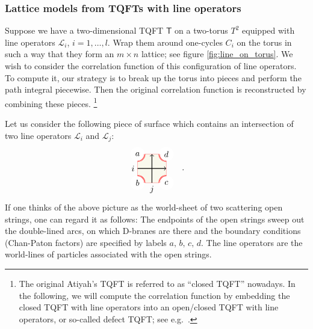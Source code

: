 \subsubsection{Lattice models from TQFTs with line operators}

Suppose we have a two-dimensional TQFT $\mathsf{T}$ on a two-torus
$T^{2}$ equipped with line operators $\mathcal{L}_{i}$, $i=1,\ldots,l$.
Wrap them around one-cycles $C_{i}$ on the torus in such a way that
they form an $m\times n$ lattice; see figure \ref{fig:line_on_torus}. We wish to consider the correlation
function of this configuration of line operators. To compute it, our
strategy is to break up the torus into pieces and perform
the path integral piecewise. Then the original correlation function
is reconstructed by combining these pieces.%
%
\footnote{The original Atiyah's TQFT is referred to as ``closed TQFT'' nowadays.
In the following, we will compute the correlation function by embedding
the closed TQFT with line operators into an open/closed TQFT with
line operators, or so-called defect TQFT; see e.g.~\cite{Lazaroiu:2000rk,Moore:2006dw,Carqueville:2016nqk}.}
%


Let us consider the following piece of surface which contains an intersection
of two line operators $\mathcal{L}_{i}$ and $\mathcal{L}_{j}$:
\begin{equation}
  \label{eq:piece_of_lines}
    \begin{tikzpicture}[scale=0.6, baseline=(x.base)]
        \node (x) at (0,0) {\vphantom{x}};

        \draw[color=red!50, fill=olive!5] (-1,-1) rectangle (1,1);

        \fill[color=white] (-1,1) circle (0.5);  \node (a) at (-1,1) {$a$};
        \draw[draw=red, double]  (-1,0.5) arc (-90:0:0.5);
        \fill[color=white] (-1,-1) circle (0.5);  \node (b) at (-1,-1) {$b$};
        \draw[draw=red, double]  (-1,-0.5) arc (90:0:0.5);
        \fill[color=white] (1,-1) circle (0.5);  \node (c) at (1,-1) {$c$};
        \draw[draw=red, double]  (1,-0.5) arc (90:180:0.5);
        \fill[color=white] (1,1) circle (0.5);  \node (d) at (1,1) {$d$};
        \draw[draw=red, double]  (1,0.5) arc (-90:-180:0.5);

        \draw[thick, ->] (-1,0) node[left] {$i$} -- (1,0);
        \draw[thick, ->] (0,-1) node[below] {$j$} -- (0,1);

    \end{tikzpicture}
  \quad .
\end{equation}
If one thinks of the above picture as the world-sheet of two scattering
open strings, one can regard it as follows: The endpoints
of the open strings sweep out the double-lined arcs, on which D-branes
are there and the boundary conditions (Chan-Paton factors) are specified
by labels $a,\,b,\,c,\,d$. The line operators are the world-lines
of particles associated with the open strings.


